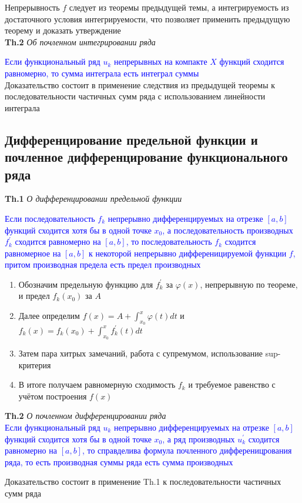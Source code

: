Непрерывность $f$ следует из теоремы предыдущей темы, а интегрируемость из достаточного условия интегрируемости,
что позволяет применить предыдущую теорему и доказать утверждение \\

\textbf{Th.2} \textit{Об почленном интегрировании ряда}

\textcolor{blue}{Если функциональный ряд $u_k$ непрерывных на компакте $X$ функций сходится
равномерно, то сумма интеграла есть интеграл суммы} \\

Доказательство состоит в применение следствия из предыдущей теоремы к последовательности частичных сумм ряда с
использованием линейности интеграла

\subsection{Дифференцирование предельной функции и почленное дифференцирование функционального ряда}

\textbf{Th.1} \textit{О дифференцировании предельной функции}

\textcolor{blue}{Если последовательность $f_k$ непрерывно дифференцируемых на отрезке $[a, b]$ функций сходится
хотя бы в одной точке $x_0$, а последовательность производных $f_k^{'}$ сходится равномерно на $[a, b]$, то
последовательность $f_k$ сходится равномерное на $[a, b]$ к некоторой непрерывно дифференицируемой функции $f$,
    притом производная предела есть предел производных}

\begin{enumerate}
    \item Обозначим предельную функцию для $f_k^{'}$ за $\varphi (x)$, непрерывную по теореме, и предел $f_k(x_0)$
    за $A$
    \item Далее определим $f(x) =  A + \int_{x_0}^x \varphi (t) dt$ и $f_k (x) = f_k (x_0) + \int_{x_0}^x f_k^{'}(
    t) dt$
    \item Затем пара хитрых замечаний, работа с супремумом, использование sup-критерия
    \item В итоге получаем равномерную сходимость $f_k$ и требуемое равенство с учётом построения $f(x)$
\end{enumerate}

\textbf{Th.2} \textit{О почленном дифференцировании ряда} \\

\textcolor{blue}{Если функциональный ряд $u_k$ непрерывно дифференцируемых на отрезке $[a, b]$ функций сходится
хотя бы в одной точке $x_0$, а ряд производных $u_k^{'}$ сходится равномерно на $[a, b]$, то
справделива формула почленного дифференицрования ряда, то есть производная суммы ряда есть сумма производных}

Доказательство состоит в применение Th.1 к последовательности частичных сумм ряда
